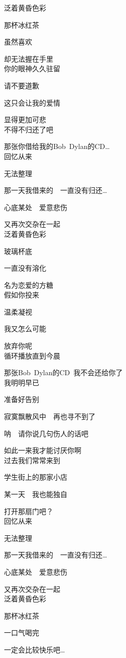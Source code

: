 泛着黄昏色彩

那杯冰红茶

虽然喜欢

却无法握在手里
\\

你的眼神久久驻留

请不要道歉

这只会让我的爱情

显得更加可悲
\\

不得不归还了吧

那张你借给我的Bob\ Dylan的CD…
\\

回忆从来

无法整理

那一天我借来的　一直没有归还…

心底某处　爱意悲伤

又再次交杂在一起
\\

泛着黄昏色彩

玻璃杯底

一直没有溶化

名为恋爱的方糖
\\

假如你投来

温柔凝视

我又怎么可能

放弃你呢
\\

循环播放直到今晨

那张Bob\ Dylan的CD\ 我不会还给你了
\\

我明明早已

准备好告别

寂寞飘散风中　再也寻不到了

呐　请你说几句伤人的话吧

如此一来我才能讨厌你啊
\\

过去我们常常来到

学生街上的那家小店

某一天　我也能独自

打开那扇门吧？
\\

回忆从来

无法整理

那一天我借来的　一直没有归还…

心底某处　爱意悲伤

又再次交杂在一起
\\

泛着黄昏色彩

那杯冰红茶

一口气喝完

一定会比较快乐吧…
\\
